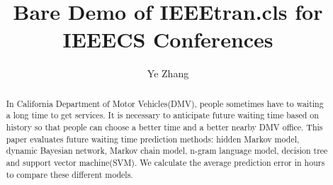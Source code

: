 \documentclass[10pt, conference, compsocconf]{IEEEtran}
\begin{document}
%
\title{Bare Demo of IEEEtran.cls for IEEECS Conferences}



\author{Ye Zhang}


% 








\maketitle


\begin{abstract}
In California Department of Motor Vehicles(DMV),  people sometimes have to waiting a long time to get services. It is necessary to anticipate future waiting time based on history so that
people can choose a better time and a better nearby DMV office. This paper evaluates future waiting time prediction methods: hidden Markov model, dynamic Bayesian network, Markov chain model, n-gram language model,
decision tree and support vector machine(SVM). We calculate the average prediction error in hours to compare these different models. 
\end{abstract}
\end{document}
